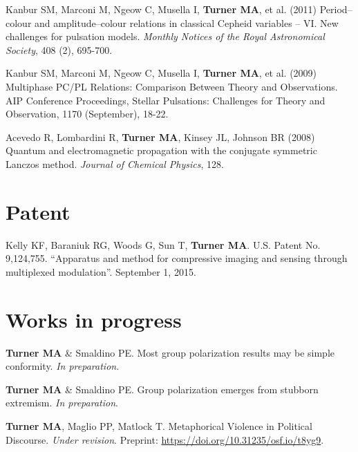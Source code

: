 \documentclass[letterpaper,11pt,oneside]{article}
\begin{document}
\begin{hangparas}{0.25in}{1}
    Kanbur SM, Marconi M, Ngeow C, Musella I, \textbf{Turner MA}, et al. (2011) Period–colour and amplitude–colour relations in classical Cepheid variables – VI. New challenges for pulsation models. \emph{Monthly Notices of the Royal Astronomical Society}, 408 (2), 695-700.

    Kanbur SM, Marconi M, Ngeow C, Musella I, \textbf{Turner MA}, et al. (2009) Multiphase PC/PL Relations: Comparison Between Theory and Observations. AIP Conference Proceedings, Stellar Pulsations: Challenges for Theory and Observation, 1170 (September), 18-22.

    Acevedo R, Lombardini R, \textbf{Turner MA}, Kinsey JL, Johnson BR (2008)
    Quantum and electromagnetic propagation with the conjugate symmetric
    Lanczos method. \emph{Journal of Chemical Physics}, 128.
    
  \end{hangparas}


\noindent
\section*{\textcolor{gunmetal}{Patent}}

  \begin{hangparas}{0.25in}{1}
  Kelly KF, Baraniuk RG, Woods G, Sun T, \textbf{Turner MA}. U.S. Patent No. 9,124,755. 
  ``Apparatus and method for compressive imaging and sensing through multiplexed modulation''.
  September 1, 2015.

    
  \end{hangparas}



\noindent

\noindent
\section*{\textcolor{gunmetal}{Works in progress}}
\begin{hangparas}{0.25in}{1}

  \textbf{Turner MA} \& Smaldino PE. Most group polarization results may be
  simple conformity.
  \emph{In preparation}.

  \textbf{Turner MA} \& Smaldino PE. Group polarization emerges from stubborn extremism.
  \emph{In preparation}.

  \textbf{Turner MA}, Maglio PP, Matlock T. Metaphorical Violence in Political Discourse. 
  \emph{Under revision}. Preprint: \url{https://doi.org/10.31235/osf.io/t8yg9}.

\end{hangparas}
\end{document}
